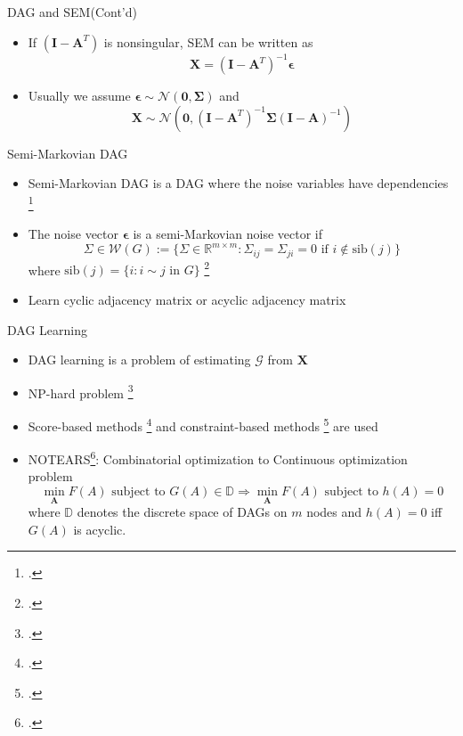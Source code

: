 \documentclass{beamer}
\begin{document}
\begin{frame}{DAG and SEM(Cont'd)}
    \begin{itemize}
        \item If $(\mathbf I-\mathbf A^T)$ is nonsingular, SEM can be written as
        \begin{equation}
            \mathbf X = (\mathbf I - \mathbf A^T)^{-1} \mathbf \epsilon
        \end{equation}
        \item Usually we assume $\mathbf \epsilon \sim \mathcal N(\mathbf 0, \mathbf \Sigma)$ and
        \begin{equation*}
            \mathbf X \sim \mathcal N(\mathbf 0, (\mathbf I - \mathbf A^T)^{-1} \mathbf \Sigma (\mathbf I - \mathbf A)^{-1})
        \end{equation*}
    \end{itemize}
\end{frame}

\begin{frame}{Semi-Markovian DAG}
    \begin{itemize}
        \item Semi-Markovian DAG is a DAG where the noise variables have dependencies \footcite{Shipster2006semimarkovian}
        \item The noise vector $\mathbf \epsilon$ is a semi-Markovian noise vector if
        \begin{equation}
            \Sigma \in \mathcal{W}(G) := \{ \Sigma \in \mathbb R^{m\times m} : \Sigma_{ij} = \Sigma_{ji} = 0 \text{ if } i \notin \text{sib}(j) \}
        \end{equation}
        where $\text{sib}(j) = \{i : i \sim j \text{ in } G\}$ \footcite{wang2017empirical}
        \item Learn cyclic adjacency matrix or acyclic adjacency matrix
    \end{itemize}
\end{frame}

\begin{frame}{DAG Learning}
    \begin{itemize}
        \item DAG learning is a problem of estimating $\mathcal G$ from $\mathbf X$
        \item NP-hard problem \footcite{ChickeringNPhard}
        \item Score-based methods \footcite{Spirtes2000} and constraint-based methods \footcite{ChickeringGES} are used
        \item NOTEARS\footcite{zheng2018dags}: Combinatorial optimization to Continuous optimization problem
        \begin{equation*}
            \min_{\mathbf{A}} F(A) \text{ subject to } G(A) \in \mathbb{D} \Rightarrow 
            \min_{\mathbf{A}} F(A) \text{ subject to } h(A)=0
        \end{equation*}
        where $\mathbb D$ denotes the discrete space of DAGs on $m$ nodes and $h(A)=0$ iff $G(A)$ is acyclic.
    \end{itemize}
\end{frame}
\end{document}
